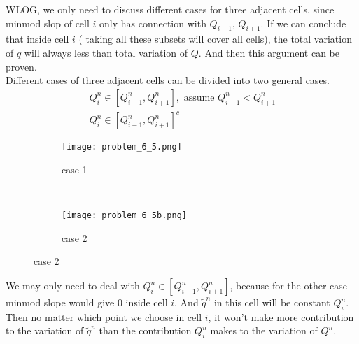 \documentclass[11pt]{article}
\begin{document}
\begin{enumerate}
        \vskip 5pt
        \vskip 5pt
        	WLOG, we only need to discuss different cases for three adjacent cells, since minmod slop of cell $i$ only has connection with $Q_{i-1}$, $Q_{i+1}$. If we can conclude that inside cell $i$ ( taking all these subsets will cover all cells), the total variation of $q$ will always less than total variation of $Q$. And then this argument can be proven.\\      	
        	
        	Different cases of three adjacent cells can be divided into two general cases.
        	\begin{align*}
        	&Q_i^n \in [Q_{i-1}^n, Q_{i+1}^n], \text{ assume $Q_{i-1}^n<Q_{i+1}^n$ }\\
        	&Q_i^n \in [Q_{i-1}^n, Q_{i+1}^n]^c
        	\end{align*}      	
			\begin{figure}[H]
						\centering
						\begin{subfigure}{1.0\textwidth}
  							\centering
  							\texttt{[image: problem\_6\_5.png]}
  							\caption{case 1}
  							\label{fig:sub1}
						\end{subfigure}%
						\\
						\begin{subfigure}{1.0\textwidth}
  							\centering
  							\texttt{[image: problem\_6\_5b.png]}
  							\caption{case 2}
  							\label{fig:sub2}
						\end{subfigure}
					\label{fig:test}
			\end{figure}        	
        	
        	We may only need to deal with $Q_i^n \in [Q_{i-1}^n, Q_{i+1}^n]$, because for the other case minmod slope would give $0$ inside cell $i$. And $\tilde{q}^n$ in this cell will be constant $Q^n_i$. Then no matter which point we choose in cell $i$, it won't make more contribution to the variation of $\tilde{q}^n$ than the contribution $Q^n_i$ makes to the variation of $Q^n$. \\
        	

\end{enumerate}
\end{document}

